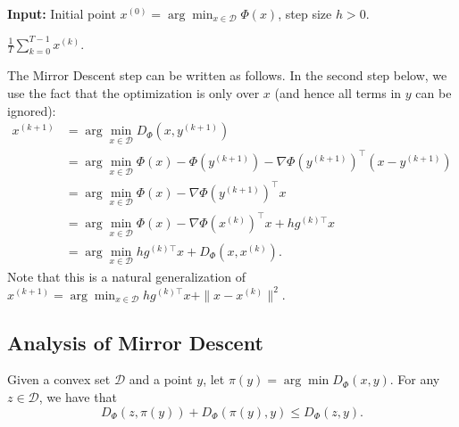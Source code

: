\begin{algorithm2e}[H]

\caption{$\mathtt{MirrorDescent}$}

\SetAlgoLined

\textbf{Input:} Initial point $x^{(0)}=\arg\min_{x\in\mathcal{D}}\Phi(x)$,
step size $h>0$.


\Return $\frac{1}{T}\sum_{k=0}^{T-1}x^{(k)}$.

\end{algorithm2e}

The Mirror Descent step can be written as follows. In the second step
below, we use the fact that the optimization is only over $x$ (and
hence all terms in $y$ can be ignored):
\begin{align}
x^{(k+1)} & =\arg\min_{x\in\mathcal{D}}D_{\Phi}(x,y^{(k+1)})\nonumber \\
 & =\arg\min_{x\in\mathcal{D}}\Phi(x)-\Phi(y^{(k+1)})-\nabla\Phi(y^{(k+1)})^{\top}(x-y^{(k+1)})\nonumber \\
 & =\arg\min_{x\in\mathcal{D}}\Phi(x)-\nabla\Phi(y^{(k+1)})^{\top}x\nonumber \\
 & =\arg\min_{x\in\mathcal{D}}\Phi(x)-\nabla\Phi(x^{(k)})^{\top}x+hg^{(k)\top}x\nonumber \\
 & =\arg\min_{x\in\mathcal{D}}hg^{(k)\top}x+D_{\Phi}(x,x^{(k)}).\label{eq:mirror_descent}
\end{align}
Note that this is a natural generalization of $x^{(k+1)}=\arg\min_{x\in\mathcal{D}}hg^{(k)\top}x+\|x-x^{(k)}\|^{2}.$

\subsection{Analysis of Mirror Descent}
\begin{lem}
\label{lem:Pythagorean2}Given a convex set $\mathcal{D}$ and a
point $y$, let $\pi(y)=\arg\min D_{\Phi}(x,y)$. For any $z\in\mathcal{D}$,
we have that
\[
D_{\Phi}(z,\pi(y))+D_{\Phi}(\pi(y),y)\leq D_{\Phi}(z,y).
\]
\end{lem}

